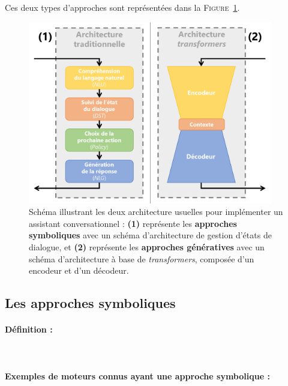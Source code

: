 		Ces deux types d'approches sont représentées dans la \textsc{Figure~\ref{figure:B.2-CHATBOT-ARCHITECTURES}}.
		\begin{figure}[!htb]
			\centering
			\includegraphics[width=0.95\textwidth]{figures/annexe-chatbots-architectures}
			\caption{
				Schéma illustrant les deux architecture usuelles pour implémenter un assistant conversationnel :
				\textbf{(1)} représente les \textbf{approches symboliques} avec un schéma d'architecture de gestion d'états de dialogue,
				et \textbf{(2)} représente les \textbf{approches génératives} avec un schéma d'architecture à base de \textit{transformers}, composée d'un encodeur et d'un décodeur.
			}
			\label{figure:B.2-CHATBOT-ARCHITECTURES}
		\end{figure}
		
		
		\subsection{Les approches symboliques}
		\label{annex:B.2.1-CHATBOT-ARCHITECTURES-SYMBOLIQUE}
		
			\paragraph{Définition :}
			
				\cite{schuurmans-frasincar:2020:intent-classification-dialogue}  \\ %
			
			\paragraph{Exemples de moteurs connus ayant une approche symbolique :}
			
